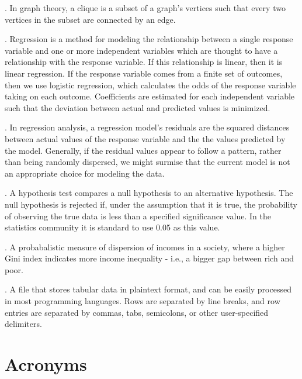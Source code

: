 \documentclass[oneside,12pt]{report}
\begin{document}
\vspace{8pt} . In graph theory, a clique is a subset of a graph's vertices such that every two vertices in the subset are connected by an edge.

\vspace{8pt} . Regression is a method for modeling the relationship between a single response variable and one or more independent variables which are thought to have a relationship with the response variable. If this relationship is linear, then it is linear regression. If the response variable comes from a finite set of outcomes, then we use logistic regression, which calculates the odds of the response variable taking on each outcome. Coefficients are estimated for each independent variable such that the deviation between actual and predicted values is minimized.

\vspace{8pt} . In regression analysis, a regression model's residuals are the squared distances between actual values of the response variable and the the values predicted by the model. Generally, if the residual values appear to follow a pattern, rather than being randomly dispersed, we might surmise that the current model is not an appropriate choice for modeling the data.

\vspace{8pt} . A hypothesis test compares a null hypothesis to an alternative hypothesis. The null hypothesis is rejected if, under the assumption that it is true, the probability of observing the true data is less than a specified significance value. In the statistics community it is standard to use 0.05 as this value.

\vspace{8pt} . A probabalistic measure of dispersion of incomes in a society, where a higher Gini index indicates more income inequality - i.e., a bigger gap between rich and poor.

\vspace{8pt} . A file that stores tabular data in plaintext format, and can be easily processed in most programming languages. Rows are separated by line breaks, and row entries are separated by commas, tabs, semicolons, or other user-specified delimiters.


\chapter{Acronyms}\label{Acronyms}
\end{document}
